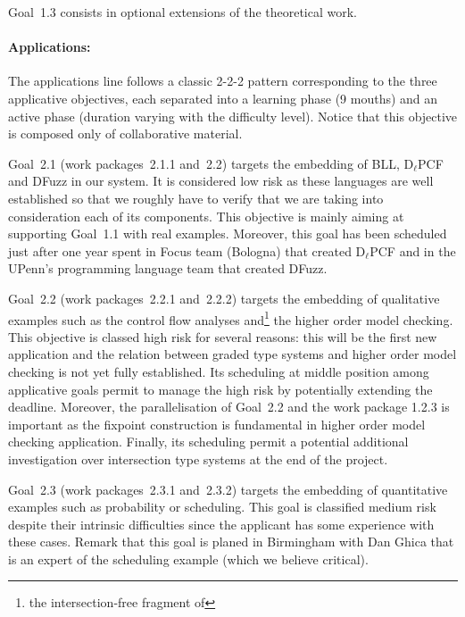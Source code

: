 \documentclass{article}[11pt]
\newcommand\BLL{BLL\xspace}
\newcommand\DlPCF{D$_\ell$PCF\xspace}
\newcommand\DFuzz{DFuzz\xspace}
\begin{document}
Goal~1.3 consists in optional extensions of the theoretical work.



\paragraph{Applications:}
The applications line follows a classic 2-2-2 pattern corresponding to the three applicative objectives, each separated into a learning phase (9 mouths) and an active phase (duration varying with the difficulty level). Notice that this objective is composed only of collaborative material.

Goal~2.1 (work packages~2.1.1 and~2.2) targets the embedding of \BLL, \DlPCF and \DFuzz in our system. It is considered low risk as these languages are well established so that we roughly have to verify that we are taking into consideration each of its components. This objective is mainly aiming at supporting Goal~1.1 with real examples. Moreover, this goal has been scheduled just after one year spent in Focus team (Bologna) that created \DlPCF and in the UPenn's programming language team that created \DFuzz.

Goal~2.2 (work packages~2.2.1 and~2.2.2) targets the embedding of qualitative examples such as the control flow analyses and\footnote{the intersection-free fragment of} the higher order model checking. This objective is classed high risk for several reasons: this will be the first new application and the relation between graded type systems and higher order model checking is not yet fully established. Its scheduling at middle position among applicative goals permit to manage the high risk by potentially extending the deadline. Moreover, the parallelisation of Goal~2.2 and the work package 1.2.3 is important as the fixpoint construction is fundamental in higher order model checking application. Finally, its scheduling permit a potential additional investigation over intersection type systems at the end of the project.

Goal~2.3 (work packages~2.3.1 and~2.3.2) targets the embedding of quantitative examples such as probability or scheduling. This goal is classified medium risk despite their intrinsic difficulties since the applicant has some experience with these cases. Remark that this goal is planed in Birmingham with Dan Ghica that is an expert of the scheduling example (which we believe critical). 
\end{document}
